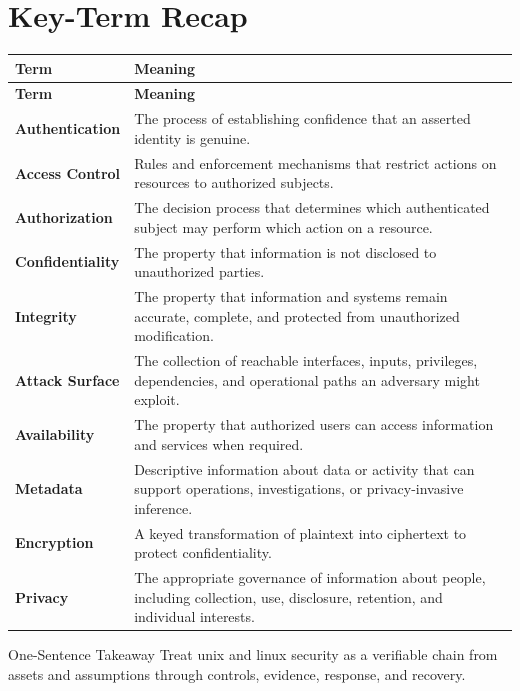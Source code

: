\documentclass[11pt,letterpaper]{article}
\begin{document}
\section*{Key-Term Recap}
\begin{longtable}{>{\raggedright\arraybackslash}p{}>{\raggedright\arraybackslash}p{}}
\toprule\rowcolor{Navy}\color{white}\textbf{Term} & \color{white}\textbf{Meaning}\\\midrule
\endfirsthead
\toprule\rowcolor{Navy}\color{white}\textbf{Term} & \color{white}\textbf{Meaning}\\\midrule
\endhead
\textbf{Authentication} & The process of establishing confidence that an asserted identity is genuine. \\\midrule
\textbf{Access Control} & Rules and enforcement mechanisms that restrict actions on resources to authorized subjects. \\\midrule
\textbf{Authorization} & The decision process that determines which authenticated subject may perform which action on a resource. \\\midrule
\textbf{Confidentiality} & The property that information is not disclosed to unauthorized parties. \\\midrule
\textbf{Integrity} & The property that information and systems remain accurate, complete, and protected from unauthorized modification. \\\midrule
\textbf{Attack Surface} & The collection of reachable interfaces, inputs, privileges, dependencies, and operational paths an adversary might exploit. \\\midrule
\textbf{Availability} & The property that authorized users can access information and services when required. \\\midrule
\textbf{Metadata} & Descriptive information about data or activity that can support operations, investigations, or privacy-invasive inference. \\\midrule
\textbf{Encryption} & A keyed transformation of plaintext into ciphertext to protect confidentiality. \\\midrule
\textbf{Privacy} & The appropriate governance of information about people, including collection, use, disclosure, retention, and individual interests. \\\midrule
\bottomrule
\end{longtable}
\begin{CornellExamBox}{One-Sentence Takeaway}
Treat unix and linux security as a verifiable chain from assets and assumptions through controls, evidence, response, and recovery.
\end{CornellExamBox}
\end{document}
